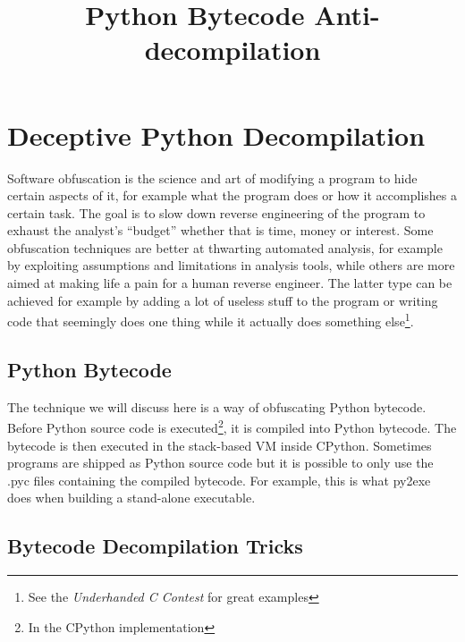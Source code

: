 \documentclass[twocolumn]{article}
\begin{document}
\title{Python Bytecode Anti-decompilation}
\date{}
\section*{Deceptive Python Decompilation}

\vspace*{-0.5\baselineskip}

Software obfuscation is the science and art of modifying a program to hide certain aspects of it, for example what the program does or how it accomplishes a certain task. The goal is to slow down reverse engineering of the program to exhaust the analyst's ``budget'' whether that is time, money or interest. Some obfuscation techniques are better at thwarting automated analysis, for example by exploiting assumptions and limitations in analysis tools, while others are more aimed at making life a pain for a human reverse engineer. The latter type can be achieved for example by adding a lot of useless stuff to the program or writing code that seemingly does one thing while it actually does something else\footnote{See the \textit{Underhanded C Contest} for great examples}.

\vspace*{-1\baselineskip}

\subsection*{Python Bytecode}

\vspace*{-0.3\baselineskip}

The technique we will discuss here is a way of obfuscating Python bytecode. Before Python source code is executed\footnote{In the CPython implementation}, it is compiled into Python bytecode. The bytecode is then executed in the stack-based VM inside CPython. Sometimes programs are shipped as Python source code but it is possible to only use the .pyc files containing the compiled bytecode. For example, this is what py2exe does when building a stand-alone executable.

\vspace*{-1\baselineskip}

\subsection*{Bytecode Decompilation Tricks}
\end{document}
